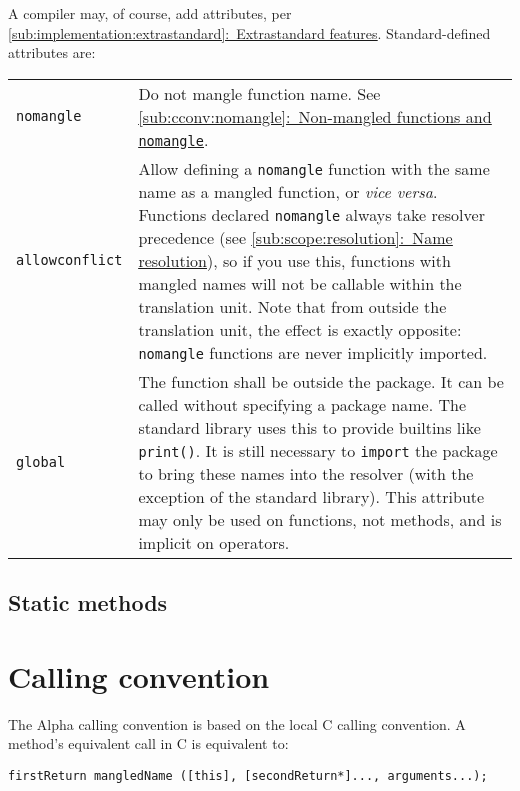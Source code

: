 \documentclass{article}
\newcommand{\textref}[2]{\hyperref[#1]{\underline{\ref*{#1}:~#2}}}
\begin{document}
A compiler may, of course, add attributes, per
\textref{sub:implementation:extrastandard}{Extrastandard features}.
Standard-defined attributes are:
\begin{center}
\begin{tabular}{|l|p{4in}|}
\hline
\texttt{nomangle} & Do not mangle function name. See
  \textref{sub:cconv:nomangle}{Non-mangled functions and \texttt{nomangle}}. \\
\texttt{allowconflict} & Allow defining a \texttt{nomangle} function with the
  same name as a mangled function, or {\it vice versa}. Functions declared
  \texttt{nomangle} always take resolver precedence (see
  \textref{sub:scope:resolution}{Name resolution}), so if you use this,
  functions with mangled names will not be callable within the translation
  unit. Note that from outside the translation unit, the effect is exactly
  opposite: \texttt{nomangle} functions are never implicitly imported. \\
\texttt{global} & The function shall be outside the package. It can be called
  without specifying a package name. The standard library uses this to provide
  builtins like \texttt{print()}. It is still necessary to \texttt{import} the
  package to bring these names into the resolver (with the exception of the
  standard library). This attribute may only be used on functions, not methods,
  and is implicit on operators. \\
\hline
\end{tabular}
\end{center}

\subsection{Static methods}
\label{sub:methods:static}

\section{Calling convention}
\label{sec:cconv}
The Alpha calling convention is based on the local C calling convention. A
method's equivalent call in C is equivalent to:

\begin{verbatim}
firstReturn mangledName ([this], [secondReturn*]..., arguments...);
\end{verbatim}
\end{document}

